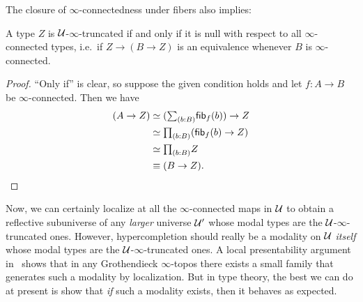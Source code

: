 The closure of $\infty$-connectedness under fibers also implies:

\begin{lem}\label{thm:trunc-null}
  A type $Z$ is $\mathcal{U}$-$\infty$-truncated if and only if it is null with respect to all $\infty$-connected types, i.e.\ if $Z \to (B\to Z)$ is an equivalence whenever $B$ is $\infty$-connected.
\end{lem}
\begin{proof}
  ``Only if'' is clear, so suppose the given condition holds and let $f:A\to B$ be $\infty$-connected.
  Then we have
  \begin{align*}
    (A \to Z)
    &\simeq (\sm{b:B}\fib{f}{b}) \to Z\\
    &\simeq \prd{b:B} (\fib{f}{b} \to Z)\\
    &\simeq \prd{b:B} Z\\
    &\jdeq (B\to Z).\qedhere
  \end{align*}
\end{proof}

Now, we can certainly localize at all the $\infty$-connected maps in $\mathcal{U}$ to obtain a reflective subuniverse of any \emph{larger} universe $\mathcal{U}'$ whose modal types are the $\mathcal{U}$-$\infty$-truncated ones.
However, hypercompletion should really be a modality on $\mathcal{U}$ \emph{itself} whose modal types are the $\mathcal{U}$-$\infty$-truncated ones.
A local presentability argument in~\cite[Prop.~6.5.2.8]{lurie2009higher} shows that in any Grothendieck $\infty$-topos there exists a small family that generates such a modality by localization.
But in type theory, the best we can do at present is show that \emph{if} such a modality exists, then it behaves as expected.

